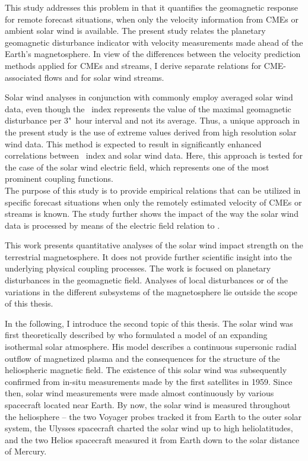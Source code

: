 This study addresses this problem in that it quantifies the geomagnetic response for remote forecast situations, when only the velocity information from CMEs or ambient solar wind is available.
The present study relates the planetary geomagnetic disturbance indicator \Kp{} with velocity measurements made ahead of the Earth's magnetosphere. In view of the differences between the velocity prediction methods applied for CMEs and streams, I derive separate relations for CME-associated flows and for solar wind streams.

Solar wind analyses in conjunction with \Kp{} commonly employ averaged solar wind data, even though the \Kp~index represents the value of the maximal geomagnetic disturbance per 3"~hour interval and not its average. Thus, a unique approach in the present study is the use of extreme values derived from high resolution solar wind data. This method is expected to result in significantly enhanced correlations between \Kp~index and solar wind data. Here, this approach is tested for the case of the solar wind electric field, which represents one of the most prominent coupling functions.\\

The purpose of this study is to provide empirical \Kp{} relations that can be utilized in specific forecast situations when only the remotely estimated velocity of CMEs or streams is known.
The study further shows the impact of the way the solar wind data is processed by means of the electric field relation to \Kp{}.

This work presents quantitative analyses of the solar wind impact strength on the terrestrial magnetosphere. It does not provide further scientific insight into the underlying physical coupling processes.
The work is focused on planetary disturbances in the geomagnetic field. Analyses of local disturbances or of the variations in the different subsystems of the magnetosphere lie outside the scope of this thesis.

\bigskip

In the following, I introduce the second topic of this thesis.
The solar wind was first theoretically described by \citet{Parker1958} who formulated a model of an expanding isothermal solar atmosphere. His model describes a continuous supersonic radial outflow of magnetized plasma and the consequences for the structure of the heliospheric magnetic field. The existence of this solar wind was subsequently confirmed from in-situ measurements made by the first satellites in 1959. Since then, solar wind measurements were made almost continuously by various spacecraft located near Earth. By now, the solar wind is measured throughout the heliosphere -- the two Voyager probes tracked it from Earth to the outer solar system, the Ulysses spacecraft charted the solar wind up to high heliolatitudes, and the two Helios spacecraft measured it from Earth down to the solar distance of Mercury.\\

